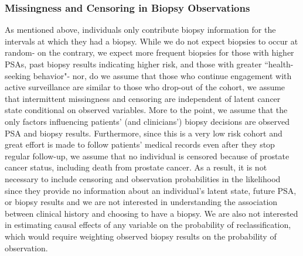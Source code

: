 \documentclass[12pt, letterpaper]{article}
\begin{document}
\subsubsection{Missingness and Censoring in Biopsy Observations}
As mentioned above, individuals only contribute biopsy information for the intervals at which they had a biopsy. While we do not expect biopsies to occur at random- on the contrary, we expect more frequent biopsies for those with higher PSAs, past biopsy results indicating higher risk, and those with greater ``health-seeking behavior"- nor, do we assume that those who continue engagement with active surveillance are similar to those who drop-out of the cohort, we assume that intermittent missingness and censoring are independent of latent cancer state conditional on observed variables. More to the point, we assume that the only factors influencing patients' (and clinicians') biopsy decisions are observed PSA and biopsy results. Furthermore, since this is a very low risk cohort and great effort is made to follow patients' medical records even after they stop regular follow-up, we assume that no individual is censored because of prostate cancer status, including death from prostate cancer. As a result, it is not necessary to include censoring and observation probabilities in the likelihood since they provide no information about an individual's latent state, future PSA, or biopsy results and we are not interested in understanding the association between clinical history and choosing to have a biopsy. We are also not interested in estimating causal effects of any variable on the probability of reclassification, which would require weighting observed biopsy results on the probability of observation.

\end{document}
